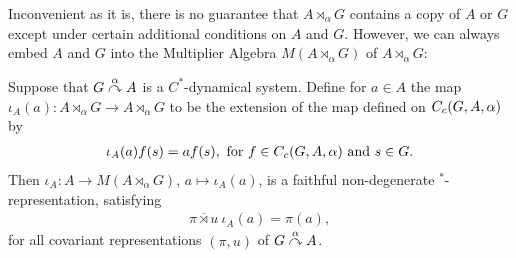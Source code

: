 Inconvenient as it is, there is no guarantee that $A \rtimes_\alpha G$ contains a copy of $A$ or $G$ except under certain additional conditions on $A$ and $G$. However, we can always embed $A$ and $G$ into the Multiplier Algebra $M(A \rtimes_\alpha G)$ of $A \rtimes_\alpha G$:
\begin{lemma}
	Suppose that $G \stackrel{\alpha}{\curvearrowright} A$ is a $C^*$-dynamical system. Define for $a \in A$ the map $\iota_A(a) \colon A \rtimes_\alpha G \to A \rtimes_\alpha G$ to be the extension of the map defined on $C_c(G,A,\alpha)$ by
	\begin{align*}
		\iota_A(a) f(s) = af(s), \text{ for } f \in C_c(G,A,\alpha) \text{ and } s \in G.
	\end{align*}
	Then $\iota_A \colon A \to M(A \rtimes_\alpha G)$, $a \mapsto \iota_A(a)$, is a faithful non-degenerate $^*$-representation, satisfying
	\begin{align*}
		\overline{\pi \rtimes u } \ \iota_A(a) = \pi(a),
	\end{align*}
	for all covariant representations $(\pi,u)$ of $G \stackrel{\alpha}{\curvearrowright} A $.
\end{lemma}
